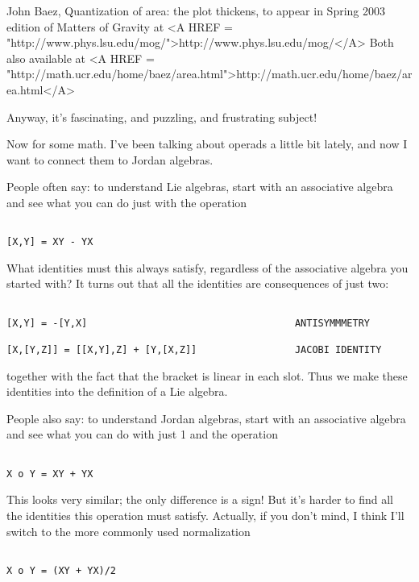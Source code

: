 John Baez, Quantization of area: the plot thickens, to appear in 
Spring 2003 edition of Matters of Gravity at <A HREF = "http://www.phys.lsu.edu/mog/">http://www.phys.lsu.edu/mog/</A>
Both also available at <A HREF = "http://math.ucr.edu/home/baez/area.html">http://math.ucr.edu/home/baez/area.html</A>

Anyway, it's fascinating, and puzzling, and frustrating subject!

Now for some math.  I've been talking about operads a little
bit lately, and now I want to connect them to Jordan algebras.  

People often say: to understand Lie algebras, start with an associative
algebra and see what you can do just with the operation


\begin{verbatim}

[X,Y] = XY - YX 
\end{verbatim}
    
What identities must this always satisfy, regardless of the associative 
algebra you started with?  It turns out that all the identities are 
consequences of just two:


\begin{verbatim}

[X,Y] = -[Y,X]                                    ANTISYMMMETRY

[X,[Y,Z]] = [[X,Y],Z] + [Y,[X,Z]]                 JACOBI IDENTITY
\end{verbatim}
    
together with the fact that the bracket is linear in each slot.
Thus we make these identities into the definition of a Lie algebra.  

People also say: to understand Jordan algebras, start with an 
associative algebra and see what you can do with just 1 and the 
operation


\begin{verbatim}

X o Y = XY + YX 
\end{verbatim}
    
This looks very similar; the only difference is a sign!  
But it's
harder to find all the identities this operation must satisfy.
Actually, if you don't mind, I think I'll switch to the more commonly
used normalization

\begin{verbatim}

X o Y = (XY + YX)/2
\end{verbatim}
    

